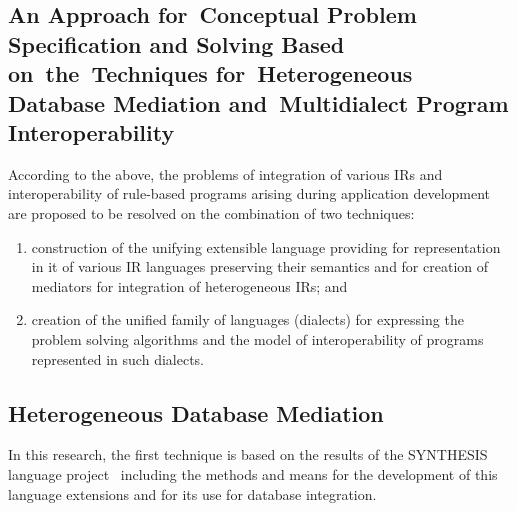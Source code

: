 \begin{multicols}{2}

    \section{An Approach for~Conceptual Problem Specification
and Solving Based on~the~Techniques for~Heterogeneous
Database Mediation and~Multidialect Program
Interoperability}


  According to the above, the problems of integration of various IRs and
interoperability of rule-based programs arising during application development are
proposed to be resolved on the combination of two techniques:
  \begin{enumerate}[(1)]
\item construction of the unifying extensible language providing for representation
in it of various IR languages preserving their semantics and for creation of
mediators for integration of heterogeneous IRs;  and
\item creation of the unified family of languages (dialects) for expressing the
problem solving algorithms and the model of interoperability of programs represented
in such dialects.
\end{enumerate}

\vspace*{-8pt}

\subsection{Heterogeneous Database Mediation}

\vspace*{-2pt}

  \noindent
  In this research, the first technique is based on the results of the SYNTHESIS
language project~\cite{4-kal} including the methods and means for the development
of this language extensions and for its use for database integration.


\end{multicols}
